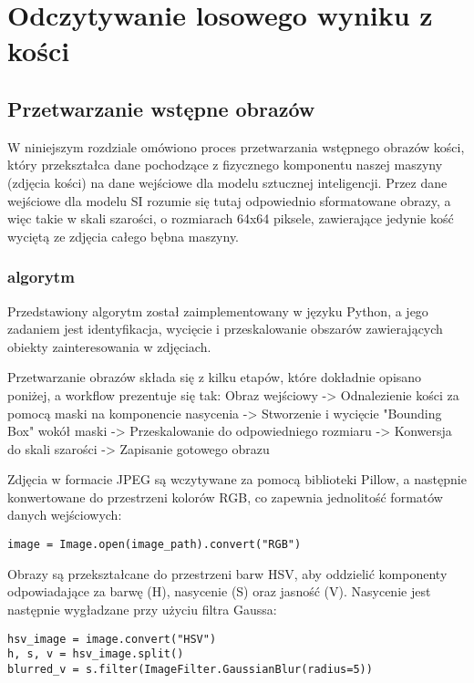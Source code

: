 
\chapter{Odczytywanie losowego wyniku z kości}

\section{Przetwarzanie wstępne obrazów}

W niniejszym rozdziale omówiono proces przetwarzania wstępnego obrazów kości, który przekształca dane pochodzące z fizycznego komponentu naszej maszyny (zdjęcia kości) na dane wejściowe dla modelu sztucznej inteligencji.
Przez dane wejściowe dla modelu SI rozumie się tutaj odpowiednio sformatowane obrazy, a więc takie w skali szarości, o rozmiarach 64x64 piksele, zawierające jedynie kość wyciętą ze zdjęcia całego bębna maszyny.

\subsection{algorytm}
Przedstawiony algorytm został zaimplementowany w języku Python, a jego zadaniem jest identyfikacja, wycięcie i przeskalowanie obszarów zawierających obiekty zainteresowania w zdjęciach.

Przetwarzanie obrazów składa się z kilku etapów, które dokładnie opisano poniżej, a workflow prezentuje się tak:
Obraz wejściowy -> Odnalezienie kości za pomocą maski na komponencie nasycenia -> Stworzenie i wycięcie "Bounding Box" wokół maski -> Przeskalowanie do odpowiedniego rozmiaru -> Konwersja do skali szarości -> Zapisanie gotowego obrazu


Zdjęcia w formacie JPEG są wczytywane za pomocą biblioteki Pillow, a następnie konwertowane do przestrzeni kolorów RGB, co zapewnia jednolitość formatów danych wejściowych:
\begin{verbatim}
image = Image.open(image_path).convert("RGB")
\end{verbatim}

Obrazy są przekształcane do przestrzeni barw HSV, aby oddzielić komponenty odpowiadające za barwę (H), nasycenie (S) oraz jasność (V).
Nasycenie jest następnie wygładzane przy użyciu filtra Gaussa:

\begin{verbatim}
hsv_image = image.convert("HSV")
h, s, v = hsv_image.split()
blurred_v = s.filter(ImageFilter.GaussianBlur(radius=5))
\end{verbatim}

